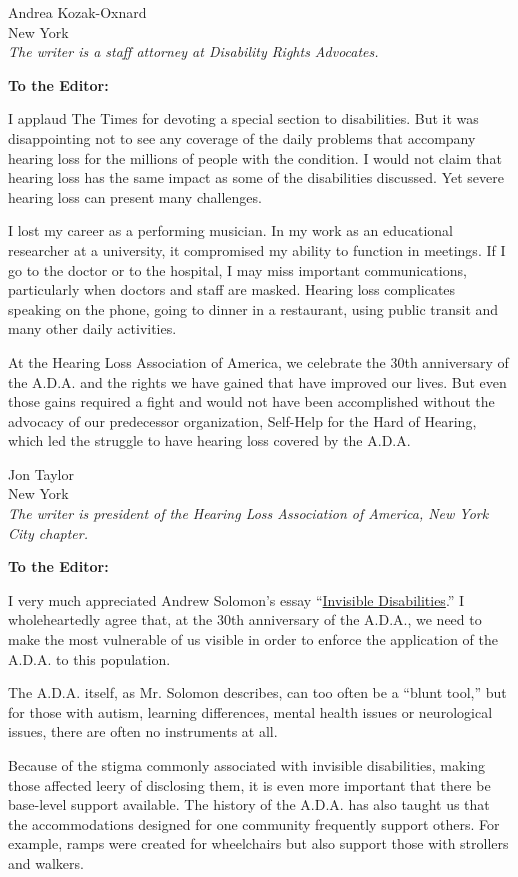 Andrea Kozak-Oxnard\\
New York\\
\emph{The writer is a staff attorney at Disability Rights Advocates.}

\textbf{To the Editor:}

I applaud The Times for devoting a special section to disabilities. But
it was disappointing not to see any coverage of the daily problems that
accompany hearing loss for the millions of people with the condition. I
would not claim that hearing loss has the same impact as some of the
disabilities discussed. Yet severe hearing loss can present many
challenges.

I lost my career as a performing musician. In my work as an educational
researcher at a university, it compromised my ability to function in
meetings. If I go to the doctor or to the hospital, I may miss important
communications, particularly when doctors and staff are masked. Hearing
loss complicates speaking on the phone, going to dinner in a restaurant,
using public transit and many other daily activities.

At the Hearing Loss Association of America, we celebrate the 30th
anniversary of the A.D.A. and the rights we have gained that have
improved our lives. But even those gains required a fight and would not
have been accomplished without the advocacy of our predecessor
organization, Self-Help for the Hard of Hearing, which led the struggle
to have hearing loss covered by the A.D.A.

Jon Taylor\\
New York\\
\emph{The writer is president of the Hearing Loss Association of
America, New York City chapter.}

\textbf{To the Editor:}

I very much appreciated Andrew Solomon's essay
``\href{https://www.nytimes3xbfgragh.onion/2020/07/10/style/invisible-disabilities.html}{Invisible
Disabilities}.'' I wholeheartedly agree that, at the 30th anniversary of
the A.D.A., we need to make the most vulnerable of us visible in order
to enforce the application of the A.D.A. to this population.

The A.D.A. itself, as Mr. Solomon describes, can too often be a ``blunt
tool,'' but for those with autism, learning differences, mental health
issues or neurological issues, there are often no instruments at all.

Because of the stigma commonly associated with invisible disabilities,
making those affected leery of disclosing them, it is even more
important that there be base-level support available. The history of the
A.D.A. has also taught us that the accommodations designed for one
community frequently support others. For example, ramps were created for
wheelchairs but also support those with strollers and walkers.

